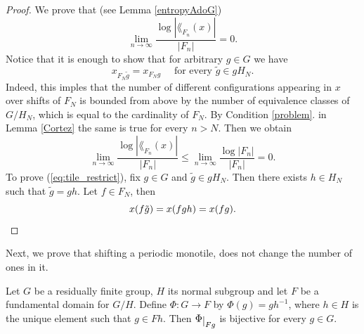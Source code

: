 \begin{proof}
We prove that (see Lemma \ref{entropyAdoG})
\begin{equation*}
\lim_{n\to\infty}\frac{\log|\lang_{F_n}(x)|}{|F_n|}=0.
\end{equation*}
Notice that it is enough to show that  for arbitrary $g\in G$ we have 
\begin{equation}\label{eq:tile_restrict}
x_{F_N\tilde g}=x_{F_Ng}\quad\text{ for every }\tilde g\in gH_N.
\end{equation}
Indeed, this imples that the number of different configurations appearing in $x$ over shifts of $F_N$ is bounded from above by the number of equivalence classes of $G/H_N$,  which is equal to the cardinality of $F_N$. By Condition \ref{problem}. in Lemma \ref{Cortez} the same is true for every $n>N$. Then we obtain
\[
\lim_{n\to\infty}\frac{\log|\lang_{F_n}(x)|}{|F_n|}\leq \lim_{n\to\infty}\frac{\log|F_n|}{|F_n|}=0.
\]
To prove (\ref{eq:tile_restrict}), fix $g\in G$ and $\tilde g\in gH_N$. Then there exists $h\in H_N$ such that $\tilde g = gh$. Let $f\in F_N$, then
\[x(f\tilde g) = x(fgh) = x(fg). \qedhere\] 
\end{proof}


\noindent
Next, we prove that shifting a periodic monotile, does not change the number of ones in it.

\begin{lem}\label{lem:bijekcja_kafelkow}
Let $G$ be a residually finite group, $H$ its normal subgroup and let $F$ be a fundamental domain  for $G/H$.
Define $\Phi\colon G\to F$ by $\Phi(g) = gh^{-1}$, where $h\in H$ is the unique element such that $g\in Fh$. Then $\Phi\restrict{Fg}$ is bijective for every $g\in G$.
\end{lem}

